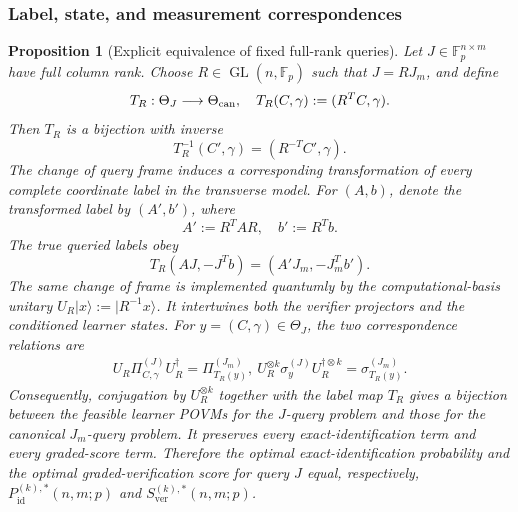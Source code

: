 \documentclass[11pt]{article}
\newcommand{\F}{\mathbb F}
\newcommand{\1}{\mathbf 1}
\newcommand{\ket}[1]{\lvert #1\rangle}
\theoremstyle{plain}
\newtheorem{proposition}[theorem]{Proposition}
\theoremstyle{definition}
\theoremstyle{remark}
\begin{document}
\subsubsection{Label, state, and measurement correspondences}
\label{subsubsec:fixed-query-correspondences}

\begin{proposition}[Explicit equivalence of fixed full-rank queries]
\label{prop:fixed-query-equivalence}
Let $J\in\F_p^{n\times m}$ have full column rank.  Choose
$R\in\operatorname{GL}(n,\F_p)$ such that $J=RJ_m$, and define
\begin{equation}
 T_R:\Theta_J\longrightarrow\Theta_{\rm can},
 \quad
 T_R(C,\gamma):=(R^TC,\gamma).
 \label{eq:fixed-query-label-map}
\end{equation}
Then $T_R$ is a bijection with inverse
\begin{equation}
 T_R^{-1}(C',\gamma)=(R^{-T}C',\gamma).
 \label{eq:fixed-query-label-map-inverse}
\end{equation}
The change of query frame induces a corresponding transformation of every
complete coordinate label in the transverse model.  For $(A,b)$, denote the transformed label by $(A',b')$, where
\begin{equation}
 A':=R^TAR,
 \quad b':=R^Tb.
 \label{eq:fixed-query-transformed-complete-label}
\end{equation}
The true queried labels obey
\begin{equation}
 T_R(AJ,-J^Tb)=(A'J_m,-J_m^Tb').
 \label{eq:fixed-query-true-label-correspondence}
\end{equation}
The same change of frame is implemented quantumly by the computational-basis
unitary $U_R\ket{x}:=\ket{R^{-1}x}$.  It intertwines both the verifier
projectors and the conditioned learner states.  For
$y=(C,\gamma)\in\Theta_J$, the two correspondence relations are
\begin{align}
 U_R\Pi_{C,\gamma}^{(J)}U_R^\dagger
 =\Pi_{T_R(y)}^{(J_m)},~
 U_R^{\otimes k}\sigma_y^{(J)}U_R^{\dagger\otimes k}
 =\sigma_{T_R(y)}^{(J_m)}.
 \label{eq:fixed-query-projector-correspondence}
\end{align}
Consequently, conjugation by $U_R^{\otimes k}$ together with the label map
$T_R$ gives a bijection between the feasible learner POVMs for the $J$-query
problem and those for the canonical $J_m$-query problem.  It preserves every
exact-identification term and every graded-score term.  Therefore the optimal
exact-identification probability and the optimal graded-verification score for
query $J$ equal, respectively,
$P_{\mathrm{id}}^{(k),*}(n,m;p)$ and $S_{\mathrm{ver}}^{(k),*}(n,m;p)$.
\end{proposition}
\end{document}
